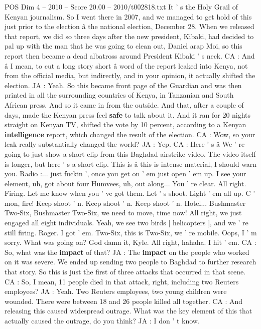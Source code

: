 \begin{textsample}{POS Dim 4 – 2010 – Score 20.00 – 2010/t002818.txt}
It ' s the Holy Grail of Kenyan journalism.
So I went there in 2007, and we managed to get hold of this just prior to the election â the national election, December 28.
When we released that report, we did so three days after the new president, Kibaki, had decided to pal up with the man that he was going to clean out, Daniel arap Moi, so this report then became a dead albatross around President Kibaki ' s neck.
CA : And â I mean, to cut a long story short â word of the report leaked into Kenya, not from the official media, but indirectly, and in your opinion, it actually shifted the election.
JA : Yeah.
So this became front page of the Guardian and was then printed in all the surrounding countries of Kenya, in Tanzanian and South African press.
And so it came in from the outside.
And that, after a couple of days, made the Kenyan press feel \textbf{safe} to talk about it.
And it ran for 20 nights straight on Kenyan TV, shifted the vote by 10 percent, according to a Kenyan \textbf{intelligence} report, which changed the result of the election.
CA : Wow, so your leak really substantially changed the world?
JA : Yep.
CA : Here ' s â We ' re going to just show a short clip from this Baghdad airstrike video.
The video itself is longer, but here ' s a short clip.
This is â this is intense material, I should warn you.
Radio :... just fuckin ', once you get on ' em just open ' em up.
I see your element, uh, got about four Humvees, uh, out along...
You ' re clear.
All right.
Firing.
Let me know when you ' ve got them.
Let ' s shoot.
Light ' em all up.
C ' mon, fire!
Keep shoot ' n.
Keep shoot ' n.
Keep shoot ' n.
Hotel...
Bushmaster Two-Six, Bushmaster Two-Six, we need to move, time now!
All right, we just engaged all eight individuals.
Yeah, we see two birds [ helicopters ], and we ' re still firing.
Roger.
I got ' em.
Two-Six, this is Two-Six, we ' re mobile.
Oops, I ' m sorry.
What was going on?
God damn it, Kyle.
All right, hahaha.
I hit ' em.
CA : So, what was the \textbf{impact} of that?
JA : The \textbf{impact} on the people who worked on it was severe.
We ended up sending two people to Baghdad to further research that story.
So this is just the first of three attacks that occurred in that scene.
CA : So, I mean, 11 people died in that attack, right, including two Reuters employees?
JA : Yeah.
Two Reuters employees, two young children were wounded.
There were between 18 and 26 people killed all together.
CA : And releasing this caused widespread outrage.
What was the key element of this that actually caused the outrage, do you think?
JA : I don ' t know.

\end{textsample}

